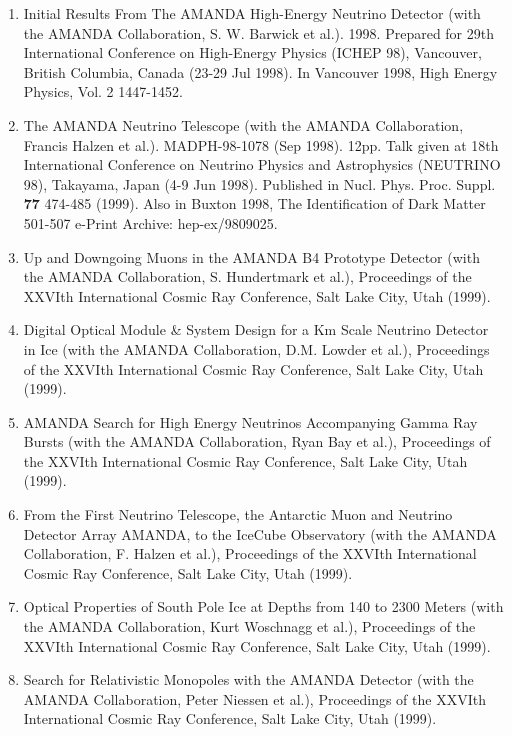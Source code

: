 \begin{enumerate}
\item Initial Results From The AMANDA High-Energy Neutrino Detector (with the AMANDA Collaboration, S. W. Barwick et al.). 1998.  Prepared for 29th International Conference on High-Energy Physics (ICHEP 98), Vancouver, British Columbia, Canada (23-29 Jul 1998). In Vancouver 1998, High Energy Physics, Vol. 2 1447-1452. 

\item The AMANDA Neutrino Telescope (with the AMANDA Collaboration, Francis Halzen et al.). MADPH-98-1078 (Sep 1998). 12pp.  Talk given at 18th International Conference on Neutrino Physics and Astrophysics (NEUTRINO 98), Takayama, Japan (4-9 Jun 1998).  Published in Nucl. Phys. Proc. Suppl. {\bf 77} 474-485 (1999). Also in Buxton 1998, The Identification of Dark Matter 501-507  e-Print Archive: hep-ex/9809025.

\item Up and Downgoing Muons in the AMANDA B4 Prototype Detector (with the AMANDA Collaboration, S. Hundertmark et al.), Proceedings of the XXVIth International Cosmic Ray Conference, Salt Lake City, Utah (1999).

\item Digital Optical Module \& System Design for a Km Scale Neutrino Detector in Ice (with the AMANDA Collaboration, D.M. Lowder et al.), Proceedings of the XXVIth International Cosmic Ray Conference, Salt Lake City, Utah (1999).

\item AMANDA Search for High Energy Neutrinos Accompanying Gamma Ray Bursts (with the AMANDA Collaboration, Ryan Bay et al.), Proceedings of the XXVIth International Cosmic Ray Conference, Salt Lake City, Utah (1999).

\item From the First Neutrino Telescope, the Antarctic Muon and Neutrino Detector Array AMANDA, to the IceCube Observatory (with the AMANDA Collaboration, F. Halzen et al.), Proceedings of the XXVIth International Cosmic Ray Conference, Salt Lake City, Utah (1999).

\item Optical Properties of South Pole Ice at Depths from 140 to 2300 Meters (with the AMANDA Collaboration, Kurt Woschnagg et al.), Proceedings of the XXVIth International Cosmic Ray Conference, Salt Lake City, Utah (1999).

\item Search for Relativistic Monopoles with the AMANDA Detector (with the AMANDA Collaboration, Peter Niessen et al.), Proceedings of the XXVIth International Cosmic Ray Conference, Salt Lake City, Utah (1999).


\end{enumerate}
